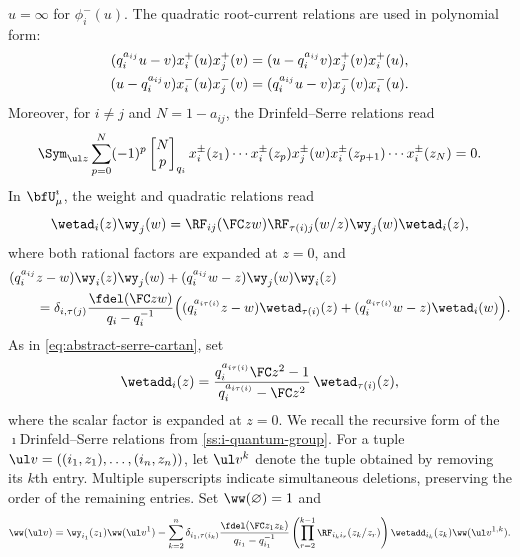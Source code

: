 \documentclass[reqno]{amsart}
\numberwithin{equation}{section}
\begin{document}
$u=\infty$ for $\phi_i^-(u)$. The quadratic root-current relations are
used in polynomial form:
\begin{align}
	(q_i^{a_{ij}}u-v)x_i^+(u)x_j^+(v)
	&=(u-q_i^{a_{ij}}v)x_j^+(v)x_i^+(u),\notag\\
	(u-q_i^{a_{ij}}v)x_i^-(u)x_j^-(v)
	&=(q_i^{a_{ij}}u-v)x_j^-(v)x_i^-(u).
	\label{app:ordinary-quadratic}
\end{align}
Moreover, for $i\ne j$ and $N=1-a_{ij}$, the Drinfeld--Serre relations read
\begin{equation}
	\Sym_{\ul z}\sum_{p=0}^{N}(-1)^p
	\begin{bmatrix}N\\p\end{bmatrix}_{q_i}
	x_i^\pm(z_1)\cdots x_i^\pm(z_p)x_j^\pm(w)
	x_i^\pm(z_{p+1})\cdots x_i^\pm(z_N)=0.
	\label{app:ordinary-serre}
\end{equation}
In $\bfU^\imath_\mu$, the weight and quadratic relations read
\begin{equation}
	\wetad_i(z)\wy_j(w)=\RF_{ij}(\FC zw)\RF_{\tau(i)j}(w/z)\wy_j(w)\wetad_i(z),
	\label{app:eta-y}
\end{equation}
where both rational factors are expanded at $z=0$, and
\begin{align}
	&(q_i^{a_{ij}}z-w)\wy_i(z)\wy_j(w)
	+(q_i^{a_{ij}}w-z)\wy_j(w)\wy_i(z)\notag\\
	&\qquad=
	\delta_{i,\tau(j)}\frac{\fdel(\FC zw)}{q_i-q_i^{-1}}
	\Bigl((q_i^{a_{i\tau(i)}}z-w)\wetad_{\tau(i)}(z)
	+(q_i^{a_{i\tau(i)}}w-z)\wetad_i(w)\Bigr).
	\label{app:y-y}
\end{align}
As in \eqref{eq:abstract-serre-cartan}, set
\begin{equation}
	\wetadd_i(z)=\frac{q_i^{a_{i\tau(i)}}\FC z^2-1}{q_i^{a_{i\tau(i)}}-\FC z^2}\,\wetad_{\tau(i)}(z),
	\label{app:ddot-eta}
\end{equation}
where the scalar factor is expanded at $z=0$.
We recall the recursive form of the $\imath$Drinfeld--Serre relations from
\ref{ss:i-quantum-group}. For a tuple $\ul v=((i_1,z_1),\ldots,(i_n,z_n))$, let $\ul v^k$ 
denote the tuple obtained by removing its $k$th entry. Multiple superscripts indicate 
simultaneous deletions, preserving the order of the remaining entries. Set 
$\ww(\varnothing)=1$ and
\begin{equation}
	\small
	\ww(\ul v)=\wy_{i_1}(z_1)\ww(\ul v^1)-\sum_{k=2}^n
	\delta_{i_1,\tau(i_k)}\frac{\fdel(\FC z_1z_k)}{q_{i_1}-q_{i_1}^{-1}}
	\left(\prod_{r=2}^{k-1}\RF_{i_k i_r}(z_k/z_r)\right)
	\wetadd_{i_k}(z_k)\ww(\ul v^{1,k}).
	\label{app:W-recursion}
\end{equation}
\end{document}
